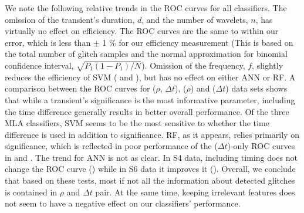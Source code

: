 \documentclass[prd, twocolumn, lengthcheck, superscriptaddress, showpacs, letterpaper, nofootinbib]{revtex4-1}
\begin{document}
%        


We note the following relative trends in the \ac{ROC} curves for all classifiers. The omission of the transient's duration, $d$, and the number of wavelets, $n$, has virtually no effect on efficiency. The \ac{ROC} curves are the same to within our error, which is less than $\pm$ 1 \% for our efficiency measurement (This is based on the total number of glitch samples and the normal approximation for binomial confidence interval, $\sqrt{P_{1}(1-P_{1})/N}$). Omission of the frequency, $f$, slightly reduces the efficiency of \ac{SVM} ( and ), but has no effect on either \ac{ANN} or \ac{RF}. A comparison between the \ac{ROC} curves for ($\rho$, $\Delta t$), ($\rho$) and ($\Delta t$) data sets shows that while a transient's significance is the most informative parameter, including the time difference generally results in better overall performance. Of the three \ac{MLA} classifiers, \ac{SVM} seems to be the most sensitive to whether the time difference is used in addition to significance. \ac{RF}, as it appears, relies primarily on significance, which is reflected in poor performance of the ($\Delta t$)-only \ac{ROC} curves in  and . The trend for \ac{ANN} is not as clear. In S4 data, including timing does not change the \ac{ROC} curve () while in S6 data it improves it (). Overall, we conclude that based on these tests, most if not all the information about detected glitches is contained in $\rho$ and $\Delta t$ pair. At the same time, keeping irrelevant features does not seem to have a negative effect on our classifiers' performance.  
\end{document}
